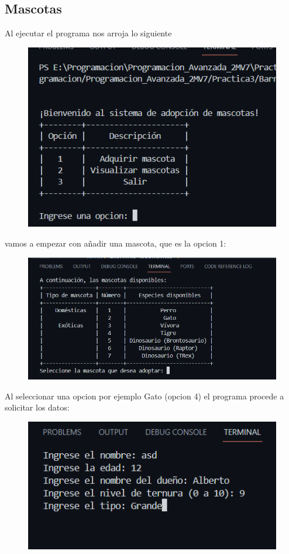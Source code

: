\documentclass[12pt]{article}
\begin{document}
\subsection{Mascotas}
Al ejecutar el programa nos arroja lo siguiente
\begin{figure}[H]
		\begin{center}
 			\includegraphics[width = .7\textwidth]{15.png}
 			
 			 	
		\end{center} 
\end{figure}
vamos a empezar con añadir una mascota, que es la opcion 1:
\begin{figure}[H]
		\begin{center}
 			\includegraphics[width = .7\textwidth]{16.png}
 			
 			 	
		\end{center} 
\end{figure}

Al seleccionar una opcion por ejemplo Gato (opcion 4) el programa procede a solicitar los datos:
\begin{figure}[H]
		\begin{center}
 			\includegraphics[width = .7\textwidth]{17.png}
 			
 			 	
		\end{center} 
\end{figure}
\end{document}
